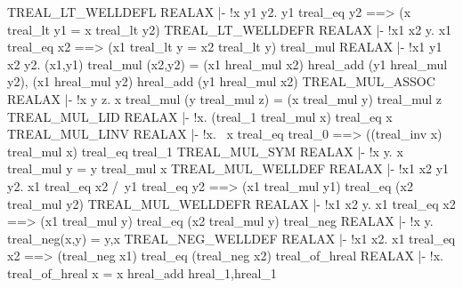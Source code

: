 \THEOREM TREAL\_LT\_WELLDEFL REALAX
|- !x y1 y2. y1 treal_eq y2 ==> (x treal_lt y1 = x treal_lt y2)
\ENDTHEOREM
\THEOREM TREAL\_LT\_WELLDEFR REALAX
|- !x1 x2 y. x1 treal_eq x2 ==> (x1 treal_lt y = x2 treal_lt y)
\ENDTHEOREM
\THEOREM treal\_mul REALAX
|- !x1 y1 x2 y2.
    (x1,y1) treal_mul (x2,y2) =
    (x1 hreal_mul x2) hreal_add (y1 hreal_mul y2),
    (x1 hreal_mul y2) hreal_add (y1 hreal_mul x2)
\ENDTHEOREM
\THEOREM TREAL\_MUL\_ASSOC REALAX
|- !x y z. x treal_mul (y treal_mul z) = (x treal_mul y) treal_mul z
\ENDTHEOREM
\THEOREM TREAL\_MUL\_LID REALAX
|- !x. (treal_1 treal_mul x) treal_eq x
\ENDTHEOREM
\THEOREM TREAL\_MUL\_LINV REALAX
|- !x.
    ~x treal_eq treal_0 ==> ((treal_inv x) treal_mul x) treal_eq treal_1
\ENDTHEOREM
\THEOREM TREAL\_MUL\_SYM REALAX
|- !x y. x treal_mul y = y treal_mul x
\ENDTHEOREM
\THEOREM TREAL\_MUL\_WELLDEF REALAX
|- !x1 x2 y1 y2.
    x1 treal_eq x2 /\ y1 treal_eq y2 ==>
    (x1 treal_mul y1) treal_eq (x2 treal_mul y2)
\ENDTHEOREM
\THEOREM TREAL\_MUL\_WELLDEFR REALAX
|- !x1 x2 y.
    x1 treal_eq x2 ==> (x1 treal_mul y) treal_eq (x2 treal_mul y)
\ENDTHEOREM
\THEOREM treal\_neg REALAX
|- !x y. treal_neg(x,y) = y,x
\ENDTHEOREM
\THEOREM TREAL\_NEG\_WELLDEF REALAX
|- !x1 x2. x1 treal_eq x2 ==> (treal_neg x1) treal_eq (treal_neg x2)
\ENDTHEOREM
\THEOREM treal\_of\_hreal REALAX
|- !x. treal_of_hreal x = x hreal_add hreal_1,hreal_1
\ENDTHEOREM
